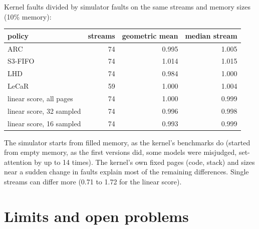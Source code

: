 \documentclass[10.5pt,a4paper]{article}
\begin{document}
Kernel faults divided by simulator faults on the same streams and memory sizes (10\% memory):

\begin{center}\small
\begin{tabular}{lrrr}
\toprule
policy & streams & geometric mean & median stream \\
\midrule
ARC & 74 & 0.995 & 1.005 \\
S3-FIFO & 74 & 1.014 & 1.015 \\
LHD & 74 & 0.984 & 1.000 \\
LeCaR & 59 & 1.000 & 1.004 \\
linear score, all pages & 74 & 1.000 & 0.999 \\
linear score, 32 sampled & 74 & 0.996 & 0.998 \\
linear score, 16 sampled & 74 & 0.993 & 0.999 \\
\bottomrule
\end{tabular}
\end{center}

The simulator starts from filled memory, as the kernel's benchmarks do (started from empty memory, as the first versions did, some models were misjudged, set-attention by up to 14 times).
The kernel's own fixed pages (code, stack) and sizes near a sudden change in faults explain most of the remaining differences. Single streams can differ more (0.71 to 1.72 for the linear score).

\section{Limits and open problems}
\label{sec:limits}
\end{document}
